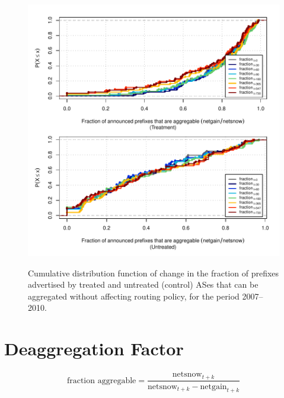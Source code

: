 \begin{figure}[H]
\begin{centering}
\begin{singlespace}
    \includegraphics[width=6in]{figures/behavior-frac_deagg-2007_2010-corr.pdf}
    \vspace{-2em}\\
    \caption{Cumulative distribution function of change in the fraction of
    prefixes advertised by treated and untreated (control) ASes that can be
    aggregated without affecting routing policy, for the period 2007--2010.}
\end{singlespace}
\end{centering}
\end{figure}

\section{Deaggregation Factor}

\[
\textrm{fraction aggregable} = \frac{\textrm{netsnow}_{t+k}}
                            {\textrm{netsnow}_{t+k} - \textrm{netgain}_{t+k}}
\]

